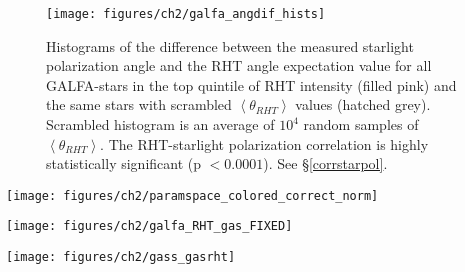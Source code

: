 \begin{figure}[h!]
\centering
\texttt{[image: figures/ch2/galfa\_angdif\_hists]}
\caption{Histograms of the difference between the measured starlight polarization angle and the RHT angle expectation value for all GALFA-\hi stars in the top quintile of RHT intensity (filled pink) and the same stars with scrambled $\left< \theta_{RHT} \right>$ values (hatched grey). Scrambled histogram is an average of $10^4$ random samples of $\left< \theta_{RHT} \right>$. The RHT-starlight polarization correlation is highly statistically significant (p $< 0.0001$). See \S\ref{corrstarpol}.}
\label{angdif_hists}
\end{figure}

\begin{figure*}[t!]
\centering
\texttt{[image: figures/ch2/paramspace\_colored\_correct\_norm]}
\caption{A sample of the parameter space for GALFA. Smoothing kernel diameter ($D_K$) and window diameter ($D_W$) are indicated. All runs use an intensity threshold $Z$ = 70\%. Red shading indicates IQR$\left(\left<\phi_{RHT} \right>\right)$, purple shading indicates IQR${(\hat{R}\left(\phi\right))}$.}
\label{pspace_fig}
\end{figure*}

\begin{figure*}[h]
\centering
\texttt{[image: figures/ch2/galfa\_RHT\_gas\_FIXED]}
\caption{A representative region of the GALFA-\hi data analyzed in \S\ref{diffuse}, shown in \hi emission (top) and RHT backprojection $R\left(x, y\right)$ (bottom; see Equation \ref{Bxy}). The images are integrated over the velocity range -7.0 km s${^{-1}}$ to -1.1 km s${^{-1}}$. Overlaid pseudovectors represent polarization angle measurements from the \cite{Heiles:2000un}, \cite{Berdyugin:2001cv}, and \citep{2002A&A...384.1050B} catalogs. In the top panel, the intensity scale is linear in log$(N_{HI})$, where black represents a column density of $2 \times 10^{18}$ cm$^{-2}$, and white is $2 \times 10^{20}$ cm$^{-2}$.}
\label{galfareg}
\end{figure*}

\begin{figure*}[h]
\centering
\texttt{[image: figures/ch2/gass\_gasrht]}
\caption{A representative region of the GASS data analyzed in \S\ref{diffuse}, as in Figure \ref{galfareg}. The images are integrated over the velocity range 1.6 km s$^{-1}$ to 5.8 km s$^{-1}$. In the top panel, the intensity scale is linear in log$(N_{HI})$, where black represents a column density of $2 \times 10^{18}$ cm$^{-2}$, and white is $2 \times 10^{21}$ cm$^{-2}$.}
\label{gassreg}
\end{figure*}

